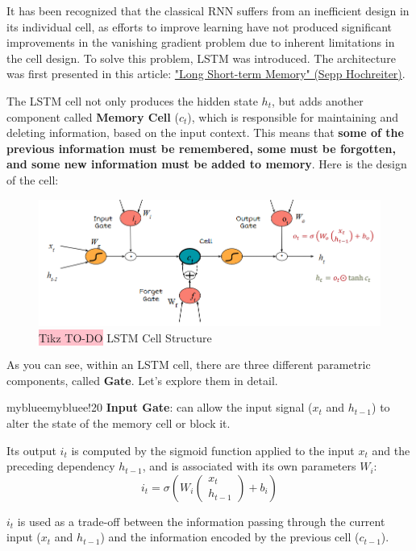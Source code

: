 It has been recognized that the classical RNN suffers from an inefficient design in its individual cell, as efforts to improve learning have not produced significant improvements in the vanishing gradient problem due to inherent limitations in the cell design. To solve this problem, LSTM was introduced. The architecture was first presented in this article: \href{https://deeplearning.cs.cmu.edu/F23/document/readings/LSTM.pdf}{"Long Short-term Memory" (Sepp Hochreiter)}.

The LSTM cell not only produces the hidden state $h_t$, but adds another component called \textbf{Memory Cell} ($c_t$), which is responsible for maintaining and deleting information, based on the input context. This means that \textbf{some of the previous information must be remembered, some must be forgotten, and some new information must be added to memory}. Here is the design of the cell:

\begin{figure}[!htbp]
    \centering
    \includegraphics[width=\linewidth]{tikz/chapter6 - LSTM.png}
    \caption{{\color{red}\colorbox{pink}{Tikz TO-DO}} LSTM Cell Structure}
\end{figure}

As you can see, within an LSTM cell, there are three different parametric components, called \textbf{Gate}. Let's explore them in detail.

\begin{remark}{mybluee}{mybluee!20}
\textbf{Input Gate}: can allow the input signal ($x_t$ and $h_{t-1}$) to alter the state of the memory cell or block it.

Its output $i_t$ is computed by the sigmoid function applied to the input $x_t$ and the preceding dependency $h_{t-1}$, and is associated with its own parameters $W_i$:
$$ i_t = \sigma(W_i
\begin{pmatrix}
x_t \\
h_{t-1}
\end{pmatrix} + b_i)
$$

$i_t$ is used as a trade-off between the information passing through the current input ($x_t$ and $h_{t-1}$) and the information encoded by the previous cell ($c_{t-1}$).
\end{remark}

